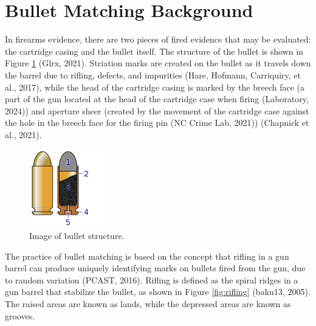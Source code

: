 \documentclass[print]{nuthesis}
\begin{document}
\hypertarget{bullet-matching-background}{%
\section{Bullet Matching Background}\label{bullet-matching-background}}

In firearms evidence, there are two pieces of fired evidence that may be evaluated: the cartridge casing and the bullet itself.
The structure of the bullet is shown in Figure \ref{fig:structure} (Glrx, 2021).
Striation marks are created on the bullet as it travels down the barrel due to rifling, defects, and impurities (Hare, Hofmann, Carriquiry, et al., 2017), while the head of the cartridge casing is marked by the breech face (a part of the gun located at the head of the cartridge case when firing (Laboratory, 2024)) and aperture sheer (created by the movement of the cartridge case against the hole in the breech face for the firing pin (NC Crime Lab, 2021)) (Chapnick et al., 2021).

\begin{figure}

{\centering \includegraphics[width=0.5\linewidth]{images/Cartridge_cross_section} 

}

\caption{Image of bullet structure.}\label{fig:structure}
\end{figure}

The practice of bullet matching is based on the concept that rifling in a gun barrel can produce uniquely identifying marks on bullets fired from the gun, due to random variation (PCAST, 2016).
Rifling is defined as the spiral ridges in a gun barrel that stabilize the bullet, as shown in Figure \ref{fig:rifling} (baku13, 2005).
The raised areas are known as lands, while the depressed areas are known as grooves.
\end{document}
